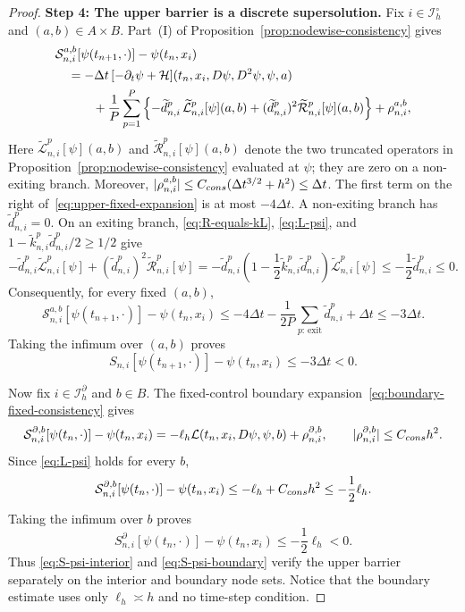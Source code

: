 \documentclass[10pt,a4paper]{amsart}
\newcommand{\cS}{\mathcal{S}}
\begin{document}
\begin{proof}
		\medskip
		\noindent\textbf{Step 4: The upper barrier is a discrete supersolution.}
		Fix $i\in\mathcal I_h^\circ$ and $(a,b)\in A\times B$.  Part~\textup{(I)}
		of Proposition~\ref{prop:nodewise-consistency} gives
		\begin{align}
			&\cS_{n,i}^{a,b}[\psi(t_{n+1},\cdot)]-\psi(t_n,x_i)
			\notag\\
			&\quad=-\Delta t\,
			[-\partial_t\psi+\mathcal H](t_n,x_i,D\psi,D^2\psi,\psi,a)
			\notag\\
			&\qquad\quad+\frac1P\sum_{p=1}^P\left\{
			-\widetilde d_{n,i}^p\,
			\widetilde{\mathcal L}_{n,i}^p[\psi](a,b)
			+(\widetilde d_{n,i}^p)^2
			\widetilde{\mathcal R}_{n,i}^p[\psi](a,b)\right\}
			+\rho_{n,i}^{a,b},
			\label{eq:upper-fixed-expansion}
		\end{align}
		Here $\widetilde{\mathcal L}_{n,i}^p[\psi](a,b)$ and
		$\widetilde{\mathcal R}_{n,i}^p[\psi](a,b)$ denote the two truncated
		operators in Proposition~\ref{prop:nodewise-consistency} evaluated at
		$\psi$; they are zero on a non-exiting branch.  Moreover,
		$|\rho_{n,i}^{a,b}|\le C_{\rm cons}(\Delta t^{3/2}+h^2)\le\Delta t$.
		The first term on the right of~\eqref{eq:upper-fixed-expansion} is at most
		$-4\Delta t$.  A non-exiting branch has $\widetilde d_{n,i}^p=0$.
		On an exiting branch, \eqref{eq:R-equals-kL}, \eqref{eq:L-psi}, and
		$1-\widetilde k_{n,i}^p\widetilde d_{n,i}^p/2\ge1/2$ give
		\[
		-\widetilde d_{n,i}^p\widetilde{\mathcal L}_{n,i}^p[\psi]
		+(\widetilde d_{n,i}^p)^2\widetilde{\mathcal R}_{n,i}^p[\psi]
		=-\widetilde d_{n,i}^p
		\left(1-\frac12\widetilde k_{n,i}^p\widetilde d_{n,i}^p\right)
		\widetilde{\mathcal L}_{n,i}^p[\psi]
		\le-\frac12\widetilde d_{n,i}^p\le0.
		\]
		Consequently, for every fixed $(a,b)$,
		\[
		\cS_{n,i}^{a,b}[\psi(t_{n+1},\cdot)]-\psi(t_n,x_i)
		\le-4\Delta t-\frac1{2P}\sum_{p:\,\mathrm{exit}}
		\widetilde d_{n,i}^p+\Delta t
		\le-3\Delta t.
		\]
		Taking the infimum over $(a,b)$ proves
		\begin{equation}
			S_{n,i}[\psi(t_{n+1},\cdot)]-\psi(t_n,x_i)\le-3\Delta t<0.
			\label{eq:S-psi-interior}
		\end{equation}
		
		Now fix $i\in\mathcal I_h^\partial$ and $b\in B$.  The fixed-control
		boundary expansion~\eqref{eq:boundary-fixed-consistency} gives
		\[
		\cS_{n,i}^{\partial,b}[\psi(t_n,\cdot)]-\psi(t_n,x_i)
		=-\ell_h\mathcal L(t_n,x_i,D\psi,\psi,b)
		+\rho_{n,i}^{\partial,b},
		\qquad |\rho_{n,i}^{\partial,b}|\le C_{\rm cons}h^2.
		\]
		Since \eqref{eq:L-psi} holds for every $b$,
		\[
		\cS_{n,i}^{\partial,b}[\psi(t_n,\cdot)]-\psi(t_n,x_i)
		\le-\ell_h+C_{\rm cons}h^2\le-\frac12\ell_h.
		\]
		Taking the infimum over $b$ proves
		\begin{equation}
			S_{n,i}^{\partial}[\psi(t_n,\cdot)]-\psi(t_n,x_i)
			\le-\frac12\ell_h<0.
			\label{eq:S-psi-boundary}
		\end{equation}
		Thus \eqref{eq:S-psi-interior} and \eqref{eq:S-psi-boundary} verify the
		upper barrier separately on the interior and boundary node sets.  Notice
		that the boundary estimate uses only $\ell_h\asymp h$ and no time-step
		condition.
		

\end{proof}
\end{document}
